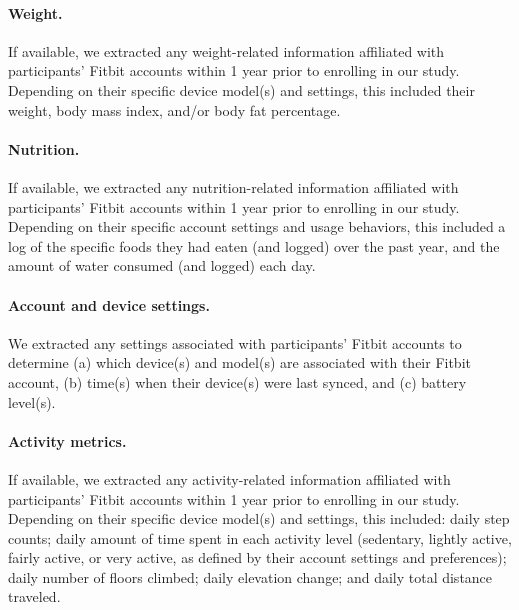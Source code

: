 \documentclass[10pt]{article}
\begin{document}
\paragraph{Weight.}  If available, we extracted any weight-related
information affiliated with participants' Fitbit accounts within 1
year prior to enrolling in our study.  Depending on their specific
device model(s) and settings, this included their weight, body mass
index, and/or body fat percentage.

\paragraph{Nutrition.} If available, we extracted any
nutrition-related information affiliated with participants' Fitbit
accounts within 1 year prior to enrolling in our study. Depending on
their specific account settings and usage behaviors, this included a
log of the specific foods they had eaten (and logged) over the past
year, and the amount of water consumed (and logged) each day.

\paragraph{Account and device settings.}  We extracted any settings
associated with participants' Fitbit accounts to determine (a) which
device(s) and model(s) are associated with their Fitbit account, (b)
time(s) when their device(s) were last synced, and (c) battery
level(s).

\paragraph{Activity metrics.}  If available, we extracted any
activity-related information affiliated with participants' Fitbit
accounts within 1 year prior to enrolling in our study.  Depending on
their specific device model(s) and settings, this included: daily step
counts; daily amount of time spent in each activity level (sedentary,
lightly active, fairly active, or very active, as defined by their
account settings and preferences); daily number of floors climbed;
daily elevation change; and daily total distance traveled.
\end{document}

